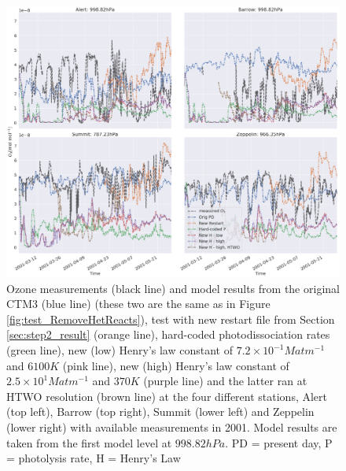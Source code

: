 \begin{figure}[ht]
    \centering
    \includegraphics[width=\linewidth]{Chapter6_Results/images/ozone_2001_step3.png}
    \caption{Ozone measurements (black line) and model results from the original CTM3 (blue line) (these two are the same as in Figure \ref{fig:test_RemoveHetReacts}), test with new restart file from Section \ref{sec:step2_result} (orange line), hard-coded photodissociation rates (green line), new (low) Henry's law constant of $7.2\times10^{-1} M atm ^{-1}$ and $6100 K$ (pink line), new (high) Henry's law constant of $2.5\times10^{1} M atm ^{-1}$ and $370 K$ (purple line) and the latter ran at HTWO resolution (brown line) at the four different stations, Alert (top left), Barrow (top right), Summit (lower left) and Zeppelin (lower right) with available measurements in 2001. Model results are taken from the first model level at $998.82 hPa$. PD = present day, P = photolysis rate, H = Henry's Law}
    \label{fig:ozone_2001_step3}
\end{figure}